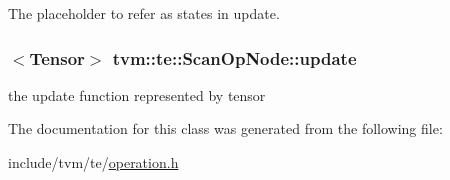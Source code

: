 The placeholder to refer as states in update. 

\subsubsection[{\texorpdfstring{update}{update}}]{$<${\bf Tensor}$>$ tvm\+::te\+::\+Scan\+Op\+Node\+::update}\hypertarget{classtvm_1_1te_1_1ScanOpNode_ace2bf7e43cd4197324ec6363626fc60a}{}\label{classtvm_1_1te_1_1ScanOpNode_ace2bf7e43cd4197324ec6363626fc60a}


the update function represented by tensor 



The documentation for this class was generated from the following file\+:\begin{DoxyCompactItemize}
\item 
include/tvm/te/\hyperlink{operation_8h}{operation.\+h}\end{DoxyCompactItemize}
